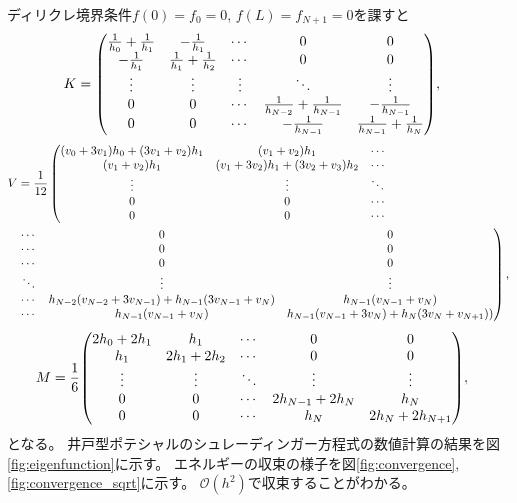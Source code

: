 \documentclass[xelatex,ja=standard]{bxjsarticle}
\begin{document}
ディリクレ境界条件$f(0) = f_0 = 0$, $f(L) = f_{N+1} = 0$を課すと
\begin{align}
    K&=
     \mqty(
     \frac{1}{h_0} + \frac{1}{h_1} & -\frac{1}{h_1} & \cdots & 0 & 0\\
     -\frac{1}{h_1} & \frac{1}{h_1} + \frac{1}{h_2} & \cdots & 0 & 0\\
     \vdots & \vdots & \vdots & \ddots & \vdots\\
     0 & 0 & \cdots & \frac{1}{h_{N-2}} + \frac{1}{h_{N-1}} & -\frac{1}{h_{N-1}} \\
     0 & 0 & \cdots & -\frac{1}{h_{N-1}} &\frac{1}{h_{N-1}} + \frac{1}{h_N} \\
     ),
\end{align}
\begin{align}
     V&= \frac{1}{12}\left(\mqty{
        \qty(v_{0} + 3v_{1})h_0 + \qty(3v_{1} +v_{2})h_1 & \qty(v_{1} +v_{2})h_1 & \cdots\\
        \qty(v_{1} +v_{2})h_1 & \qty(v_{1} + 3v_{2})h_1 + \qty(3v_{2} + v_{3})h_2 & \cdots\\
        \vdots & \vdots & \ddots\\
        0 & 0 & \cdots\\
        0 & 0 & \cdots\\
        }\right.\notag\\
     &  \left.\mqty{
        \cdots  & 0 & 0\\
        \cdots & 0 & 0\\
        \cdots& 0 & 0\\
        \ddots  & \vdots& \vdots\\
        \cdots & h_{N-2}\qty(v_{N-2} + 3v_{N-1}) + h_{N-1}\qty(3v_{N-1} + v_{N})& h_{N-1}\qty(v_{N - 1} +v_{N})\\
        \cdots & h_{N-1}\qty(v_{N - 1} +v_{N})& h_{N-1}\qty(v_{N-1} + 3v_{N}) + h_N\qty(3v_{N} + v_{N +1})) \\
        }\right),
\end{align}
\begin{align}
    M&=
     \frac{1}{6}\mqty(
     2h_0 + 2h_1 & h_1 & \cdots & 0 & 0\\
     h_1 & 2h_1 + 2h_2 & \cdots & 0 & 0\\
     \vdots & \vdots & \ddots & \vdots  & \vdots\\
     0 & 0 & \cdots & 2h_{N - 1} + 2h_{N} & h_N\\
     0 & 0 & \cdots & h_N & 2h_{N} + 2h_{N+1} \\
     ),
\end{align}
となる。
井戸型ポテシャルのシュレーディンガー方程式の数値計算の結果を図\ref{fig:eigenfunction}に示す。
エネルギーの収束の様子を図\ref{fig:convergence}, \ref{fig:convergence_sqrt}に示す。
$\mathcal{O}(h^2)$で収束することがわかる。
\end{document}
